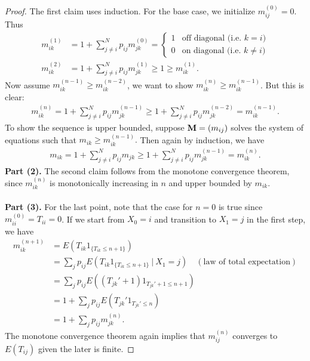 \documentclass[./some_latex_template.tex]{subfiles}
\begin{document}
\begin{proof}
The first claim uses induction. For the base case, we initialize $m_{ij}^{(0)} = 0$. Thus
\begin{align*}
	m_{ik}^{(1)} 
	&= 1 + \sum_{j\neq i}^{N} p_{ij}m_{jk}^{(0)} = 
	\begin{cases}
		1 & \text{off diagonal (i.e. } k = i)\\
		0 & \text{on diagonal (i.e. } k \neq i)
	\end{cases}\\
	m_{ik}^{(2)} 
	&= 1 + \sum_{j\neq i}^{N} p_{ij} m_{jk}^{(1)} \ge 1 \ge m_{ik}^{(1)}.
\end{align*} 
Now assume $m_{ik}^{(n-1)} \ge m_{ik}^{(n-2)}$, we want to show $m_{ik}^{(n)} \ge m_{ik}^{(n-1)}$. But this is clear: 
\begin{align*}
	m_{ik}^{(n)} = 1 + \sum_{j\neq i}^{N} p_{ij} m_{jk}^{(n - 1)} \geq  1 + \sum_{j\neq i}^{N} p_{ij} m_{jk}^{(n-2)} = 	m_{ik}^{(n - 1)}.
\end{align*}
To show the sequence is upper bounded, suppose $\mathbf{M} = (m_{ij})$ solves the system of equations such that $m_{ik} \ge m_{ik}^{(n - 1)}.$ Then again by induction, we have
\begin{align*}
	m_{ik} = 1 + \sum_{j \neq i}^{N}p_{ij}m_{jk} \ge 1 + \sum_{j\neq i}^N p_{ij} m_{jk}^{(n-1)} = m_{ik}^{(n)}.
\end{align*}
\textbf{Part (2).} The second claim follows from the monotone convergence theorem, since $m_{ik}^{(n)}$ is monotonically increasing in $n$ and upper bounded by $m_{ik}$. \\
\\
\textbf{Part (3).} For the last point, note that the case for $n = 0$ is true since $m_{ii}^{(0)} = T_{ii} = 0$. If we start from $X_0 = i$ and transition to $X_1 = j$ in the first step, we have
\begin{align*}
	m_{ik}^{(n + 1)} 
	&= E\left( T_{ik} 1_{\{T_{ik} \le n + 1\}} \right)\\
	&= \sum_{j} p_{ij} E\left( T_{ik} 1_{\{T_{ik} \le n + 1\}} \ \big| \ X_1 = j\right) \quad (\text{law of total expectation})\\
	&= \sum_{j} p_{ij} E\left( (T_{jk}' + 1) 1_{T_{jk}' + 1 \le n + 1} \right)\\
	&= 1 + \sum_{j} p_{ij} E\left( T_{jk}' 1_{T_{jk}' \le n} \right)\\
	&= 1 + \sum_{j}p_{ij}m_{jk}^{(n)}.
\end{align*} 
The monotone convergence theorem again implies that $m_{ij}^{(n)}$ converges to $E(T_{ij})$ given the later is finite. 
\end{proof}
\end{document}
